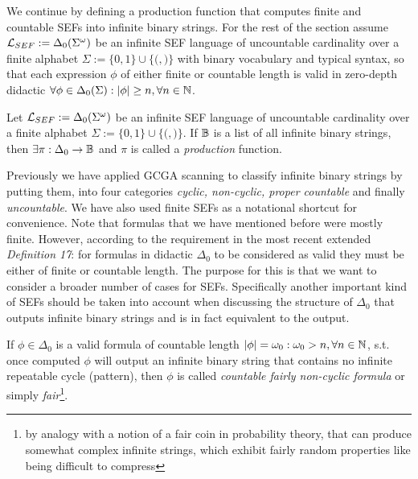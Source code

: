We continue by defining a production function that computes finite and countable SEFs into infinite binary strings. For the rest of the section assume $\mathcal{L}_{SEF} := \Delta_0(\Sigma^\omega)$ be an infinite SEF language of uncountable cardinality over a finite alphabet $\Sigma := \{0,1\} \cup \{{(}, {)}\}$ with binary vocabulary and typical syntax, so that each expression $\phi$ of either finite or countable length is valid in zero-depth didactic $\forall \phi \in \Delta_0(\Sigma): |\phi| \geq n, \forall n \in \mathbb{N}$.

\begin{definition}\label{def_prodfunc}
  Let $\mathcal{L}_{SEF} := \Delta_0(\Sigma^\omega)$ be an infinite SEF language of uncountable cardinality over a finite alphabet $\Sigma := \{0,1\} \cup \{{(}, {)}\}$. If $\mathbb{B}$ is a list of all infinite binary strings, then $\exists \pi: \Delta_0 \to \mathbb{B}$ and $\pi$ is called a \textit{production} function.
\end{definition}

Previously we have applied GCGA scanning to classify infinite binary strings by putting them, into four categories \textit{cyclic, non-cyclic, proper countable} and finally \textit{uncountable}. We have also used finite SEFs as a notational shortcut for convenience. Note that formulas that we have mentioned before were mostly finite. However, according to the requirement in the most recent extended \textit{Definition 17}: for formulas in didactic $\Delta_0$ to be considered as valid they must be either of finite or countable length. The purpose for this is that we want to consider a broader number of cases for SEFs. Specifically another important kind of SEFs should be taken into account when discussing the structure of $\Delta_0$ that outputs infinite binary strings and is in fact equivalent to the output.


\begin{definition}\label{def_fair_sef}
  If $\phi \in \Delta_0$ is a valid formula of countable length $|\phi| = \omega_0: \omega_0 > n, \forall n \in \mathbb{N}$, s.t. once computed $\phi$ will output an infinite binary string that contains no infinite repeatable cycle (pattern), then $\phi$ is called \textit{countable fairly non-cyclic formula} or simply \textit{fair}\footnote{by analogy with a notion of a fair coin in probability theory, that can produce somewhat complex infinite strings, which exhibit fairly random properties like being difficult to compress}.
\end{definition}

